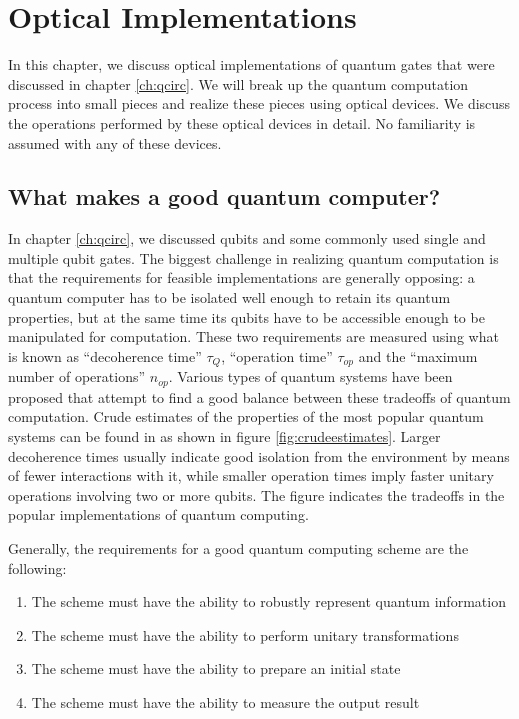 \chapter{Optical Implementations\label{ch:optimp}}
In this chapter, we discuss optical implementations of quantum gates that were discussed in chapter \ref{ch:qcirc}. We will break up the quantum computation process into small pieces and realize these pieces using optical devices. We discuss the operations performed by these optical devices in detail. No familiarity is assumed with any of these devices.

\section{What makes a good quantum computer?}
In chapter \ref{ch:qcirc}, we discussed qubits and some commonly used single and multiple qubit gates. The biggest challenge in realizing quantum computation is that the requirements for feasible implementations are generally opposing: a quantum computer has to be isolated well enough to retain its quantum properties, but at the same time its qubits have to be accessible enough to be manipulated for computation. These two requirements are measured using what is known as ``decoherence time'' $\tau_Q$, ``operation time'' $\tau_{op}$ and the ``maximum number of operations'' $n_{op}$. Various types of quantum systems have been proposed that attempt to find a good balance between these tradeoffs of quantum computation. Crude estimates of the properties of the most popular quantum systems can be found in \cite{nielsen2000} as shown in figure \ref{fig:crudeestimates}. Larger decoherence times usually indicate good isolation from the environment by means of fewer interactions with it, while smaller operation times imply faster unitary operations involving two or more qubits. The figure indicates the tradeoffs in the popular implementations of quantum computing.


Generally, the requirements for a good quantum computing scheme are the following:
\begin{enumerate}\label{requirements}
\item The scheme must have the ability to robustly represent quantum information
\item The scheme must have the ability to perform unitary transformations
\item The scheme must have the ability to prepare an initial state
\item The scheme must have the ability to measure the output result
\end{enumerate}

